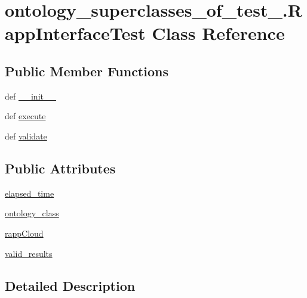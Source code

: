 \hypertarget{classontology__superclasses__of__test__1_1_1RappInterfaceTest}{\section{ontology\-\_\-superclasses\-\_\-of\-\_\-test\-\_.\-Rapp\-Interface\-Test Class Reference}
\label{classontology__superclasses__of__test__1_1_1RappInterfaceTest}
}
\subsection*{Public Member Functions}
\begin{DoxyCompactItemize}
\item 
def \hyperlink{classontology__superclasses__of__test__1_1_1RappInterfaceTest_a33e96824e7575e31b064812771db528c}{\-\_\-\-\_\-init\-\_\-\-\_\-}
\item 
def \hyperlink{classontology__superclasses__of__test__1_1_1RappInterfaceTest_a49e2f341535680604ddc27c427bef687}{execute}
\item 
def \hyperlink{classontology__superclasses__of__test__1_1_1RappInterfaceTest_a18ee29f51864a85a306c0ef474d6b4da}{validate}
\end{DoxyCompactItemize}
\subsection*{Public Attributes}
\begin{DoxyCompactItemize}
\item 
\hyperlink{classontology__superclasses__of__test__1_1_1RappInterfaceTest_ae0dfd7c52ae49946bde36b6efdec21fe}{elapsed\-\_\-time}
\item 
\hyperlink{classontology__superclasses__of__test__1_1_1RappInterfaceTest_a8ddaffc55ac0246cb932b87b846dc7fb}{ontology\-\_\-class}
\item 
\hyperlink{classontology__superclasses__of__test__1_1_1RappInterfaceTest_a190b0e0648f67d0bb5dbcb9d7c905316}{rapp\-Cloud}
\item 
\hyperlink{classontology__superclasses__of__test__1_1_1RappInterfaceTest_aff8a66661db1cce80a92ec0f13651ef0}{valid\-\_\-results}
\end{DoxyCompactItemize}


\subsection{Detailed Description}


